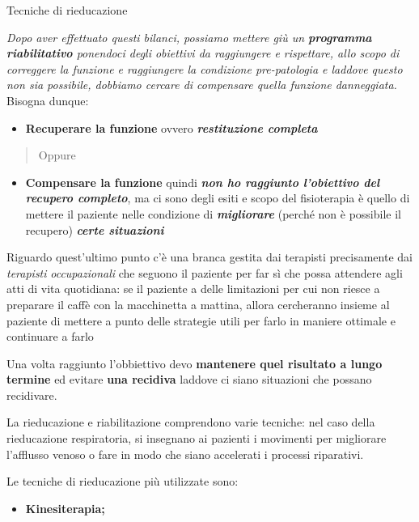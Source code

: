 \documentclass[]{article}
\begin{document}
Tecniche di rieducazione

\emph{Dopo aver effettuato questi bilanci, possiamo mettere giù un
\textbf{\emph{programma riabilitativo}} ponendoci degli obiettivi da
raggiungere e rispettare, allo scopo di correggere la funzione e
raggiungere la condizione pre-patologia e laddove questo non sia
possibile, dobbiamo cercare di compensare quella funzione danneggiata.}
Bisogna dunque:

\begin{itemize}
\item
  \textbf{Recuperare la funzione} ovvero \textbf{\emph{restituzione
  completa}}
\end{itemize}

\begin{quote}
Oppure
\end{quote}

\begin{itemize}
\item
  \textbf{Compensare la funzione} quindi \textbf{\emph{non ho raggiunto
  l'obiettivo del recupero completo}}, ma ci sono degli esiti e scopo
  del fisioterapia è quello di mettere il paziente nelle condizione di
  \textbf{\emph{migliorare}} (perché non è possibile il recupero)
  \textbf{\emph{certe situazioni}}
\end{itemize}

Riguardo quest'ultimo punto c'è una branca gestita dai terapisti
precisamente dai \emph{terapisti} \emph{\emph{occupazionali}} che
seguono il paziente per far sì che possa attendere agli atti di vita
quotidiana: se il paziente a delle limitazioni per cui non riesce a
preparare il caffè con la macchinetta a mattina, allora cercheranno
insieme al paziente di mettere a punto delle strategie utili per farlo
in maniere ottimale e continuare a farlo

Una volta raggiunto l'obbiettivo devo \textbf{mantenere quel risultato a
lungo termine} ed evitare \textbf{una recidiva} laddove ci siano
situazioni che possano recidivare.

La rieducazione e riabilitazione comprendono varie tecniche: nel caso
della rieducazione respiratoria, si insegnano ai pazienti i movimenti
per migliorare l'afflusso venoso o fare in modo che siano accelerati i
processi riparativi.

Le tecniche di rieducazione più utilizzate sono:

\begin{itemize}
\item
  \textbf{Kinesiterapia;}
\end{itemize}
\end{document}
